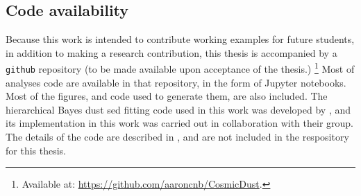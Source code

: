   \subsection{Code availability}
    Because this work is intended to contribute working examples for future students, in addition to making a research contribution, this thesis is accompanied by a {\tt github} repository (to be made available upon acceptance of the thesis.) \footnote{Available at: \url{https://github.com/aaroncnb/CosmicDust}.} Most of analyses code are available in that repository, in the form of Jupyter notebooks. Most of the figures, and code used to generate them, are also included. The hierarchical Bayes dust \gls{sed} fitting code used in this work was developed by \cite{galliano18}, and its implementation in this work was carried out in collaboration with their group. The details of the code are described in \cite{galliano18}, and are not included in the respository for this thesis.
